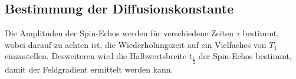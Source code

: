 \subsection{Bestimmung der Diffusionskonstante}
Die Amplituden der Spin-Echos werden für verschiedene Zeiten $\tau$ bestimmt, wobei
darauf zu achten ist, die Wiederholungszeit auf ein Vielfaches von $T_1$ einzustellen.
Desweiteren wird die Halbwertsbreite $t_{\frac{1}{2}}$ der Spin-Echos bestimmt, damit der
Feldgradient ermittelt werden kann.
